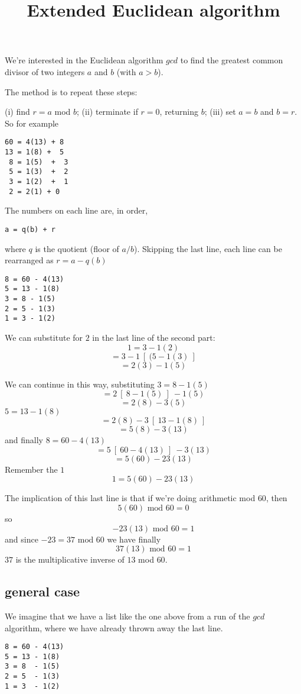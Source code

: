 \documentclass[11pt, oneside]{article}   	%
\title{Extended Euclidean algorithm}
\date{}							%
\begin{document}
\maketitle
\Large

We're interested in the Euclidean algorithm $gcd$ to find the greatest common divisor of two integers $a$ and $b$ (with $a > b$).

The method is to repeat these steps:  

(i) find $r = a$ mod $b$;  (ii) terminate if $r = 0$, returning $b$;  (iii) set $a = b$ and $b = r$.  So for example
\begin{verbatim}
60 = 4(13) + 8
13 = 1(8) +  5
 8 = 1(5)  +  3
 5 = 1(3)  +  2
 3 = 1(2)  +  1
 2 = 2(1) + 0
\end{verbatim}
The numbers on each line are, in order,

\begin{verbatim}
a = q(b) + r 
\end{verbatim}
where $q$ is the quotient (floor of $a/b$).  Skipping the last line, each line can be rearranged as $r = a - q(b)$

\begin{verbatim}
8 = 60 - 4(13)
5 = 13 - 1(8)
3 = 8 - 1(5)
2 = 5 - 1(3)
1 = 3 - 1(2)
\end{verbatim}

We can substitute for $2$ in the last line of the second part:
\[ 1 = 3 - 1(2) \]
\[ = 3 - 1 \ [ \ (5 - 1(3) \ ] \]
\[ = 2(3) - 1(5) \]

We can continue in this way, substituting $3 = 8 - 1(5)$
\[ = 2 \ [ \ 8 - 1(5) \ ] \ - 1(5) \]
\[ = 2(8) - 3(5) \]
$5 = 13 - 1(8)$
\[ = 2(8) - 3 \ [ \ 13 - 1(8) \ ] \]
\[ = 5(8) - 3(13) \]
and finally $8 = 60 - 4(13)$
\[ = 5 \ [ \ 60 - 4(13) \ ] \ - 3(13) \]
\[ = 5(60) - 23(13) \]
Remember the $1$
\[ 1 = 5(60) - 23(13) \]

The implication of this last line is that if we're doing arithmetic mod $60$, then
\[ 5(60)  \text{ mod } 60 = 0 \]
so
\[ - 23(13)  \text{ mod } 60 = 1 \]
and since $-23 = 37  \text{ mod } 60$ we have finally
\[ 37(13)  \text{ mod } 60 = 1 \]
$37$ is the multiplicative inverse of $13$ mod $60$.

\subsection*{general case}

We imagine that we have a list like the one above from a run of the $gcd$ algorithm, where we have already thrown away the last line.
\begin{verbatim}
8 = 60 - 4(13)
5 = 13 - 1(8)
3 = 8  - 1(5)
2 = 5  - 1(3)
1 = 3  - 1(2)
\end{verbatim}
\end{document}
